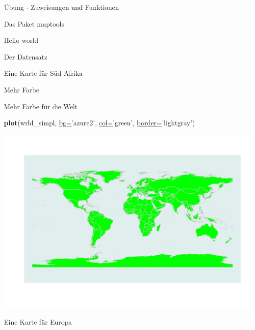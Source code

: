 \documentclass[ignorenonframetext,]{beamer}
\newenvironment{Shaded}{\begin{snugshade}}{\end{snugshade}}
\newcommand{\DataTypeTok}[1]{\textcolor[rgb]{0.74,0.68,0.62}{\underline{#1}}}
\newcommand{\KeywordTok}[1]{\textcolor[rgb]{0.26,0.66,0.93}{\textbf{#1}}}
\newcommand{\NormalTok}[1]{\textcolor[rgb]{0.74,0.68,0.62}{#1}}
\newcommand{\OperatorTok}[1]{\textcolor[rgb]{0.74,0.68,0.62}{#1}}
\newcommand{\StringTok}[1]{\textcolor[rgb]{0.02,0.61,0.04}{#1}}
\begin{document}
\begin{frame}[fragile]{Übung - Zuweisungen und Funktionen}
\begin{frame}[fragile]{Das Paket maptools}
\begin{frame}[fragile]{Hello world}
\begin{frame}[fragile]{Der Datensatz}
\begin{frame}[fragile]{Eine Karte für Süd Afrika}
\begin{frame}[fragile]{Mehr Farbe}
\end{frame}

\begin{frame}[fragile]{Mehr Farbe für die Welt}
\protect\hypertarget{mehr-farbe-fur-die-welt}{}

\begin{Shaded}
\begin{Highlighting}[]
\KeywordTok{plot}\NormalTok{(wrld_simpl, }\DataTypeTok{bg=}\StringTok{'azure2'}\NormalTok{, }\DataTypeTok{col=}\StringTok{'green'}\NormalTok{,}
     \DataTypeTok{border=}\StringTok{'lightgray'}\NormalTok{)}
\end{Highlighting}
\end{Shaded}

\includegraphics{Geomedizin_files/figure-beamer/unnamed-chunk-74-1.pdf}

\end{frame}

\begin{frame}[fragile]{Eine Karte für Europa}
\protect\hypertarget{eine-karte-fur-europa}{}

\begin{Shaded}
\end{Shaded}


\end{frame}
\end{frame}
\end{frame}
\end{frame}
\end{frame}
\end{frame}
\end{document}
